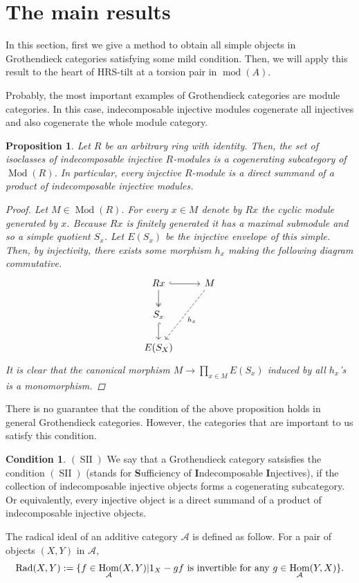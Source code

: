 \documentclass[12pt]{amsart}
\numberwithin{equation}{section}
\newtheorem{proposition}[lemma]{Proposition}
\theoremstyle{definition}
\newtheorem{condition}[lemma]{Condition}
\DeclareMathOperator{\Mod}{Mod}
\DeclareMathOperator{\modd}{mod}
\DeclareMathOperator{\Hom}{Hom}
\DeclareMathOperator{\SII}{SII}
\DeclareMathOperator{\Rad}{Rad}
\newtheorem*{theorem 0*}{Theorem}
\newtheorem*{theorem a*}{Theorem A}
\newtheorem*{theorem b*}{Theorem B}
\newcounter{diagram}
\numberwithin{diagram}{section}
\begin{document}
\section{The main results}
	In this section, first we give a method to obtain all simple objects in Grothendieck categories satisfying some mild condition. Then, we will apply this result to the heart of HRS-tilt at a torsion pair in $\modd(A)$.
	
	Probably, the most important examples of Grothendieck categories are module categories. In this case, indecomposable injective modules cogenerate all injectives and also cogenerate the whole module category.
	\begin{proposition}\label{3.1}
	Let $R$ be an arbitrary ring with identity. Then, the set of isoclasses of indecomposable injective $R$-modules is a cogenerating subcategory of $\Mod(R)$. In particular, every injective $R$-module is a direct summand of a product of indecomposable injective modules.
	\begin{proof}
	Let $M\in\Mod(R)$. For every $x\in M$ denote by $Rx$ the cyclic module generated by $x$. Because $Rx$ is finitely generated it has a maximal submodule and so a simple quotient $S_x$. Let $E(S_x)$ be the injective envelope of this simple. Then, by injectivity, there exists some morphism $h_x$ making the following diagram commutative.
	\[\begin{tikzcd}
	Rx & M \\
	{S_x} \\
	{E(S_X)}
	\arrow[hook, from=1-1, to=1-2]
	\arrow[two heads, from=1-1, to=2-1]
	\arrow["{h_x}", dashed, from=1-2, to=3-1]
	\arrow[hook, from=2-1, to=3-1]
\end{tikzcd}\]
It is clear that the canonical morphism $M\rightarrow \prod_{x\in M}E(S_x)$ induced by all $h_x$'s is a monomorphism. 
	\end{proof}
	\end{proposition}
	
	There is no guarantee that the condition of the above proposition holds in general Grothendieck categories. However, the categories that are important to us satisfy this condition.
	\begin{condition}$(\SII)$
	We say that a Grothendieck category satsisfies the condition $(\SII)$ (stands for \textbf{S}ufficiency of \textbf{I}ndecomposable \textbf{I}njectives), if the collection of indecomposable injective objects forms a cogenerating subcategory. Or equivalently, every injective object is a direct summand of a product of indecomposable injective objects.
	\end{condition}
The radical ideal of an additive category $\mathcal{A}$ is defined as follow. For a pair of objects $(X,Y)$ in $\mathcal{A}$,
\[\Rad(X,Y):=\{f\in \Hom_{\mathcal{A}}(X,Y)|1_X-gf \space\text{ is invertible for any }\space  g\in\Hom_\mathcal{A}(Y,X)\}.\]
\end{document}
